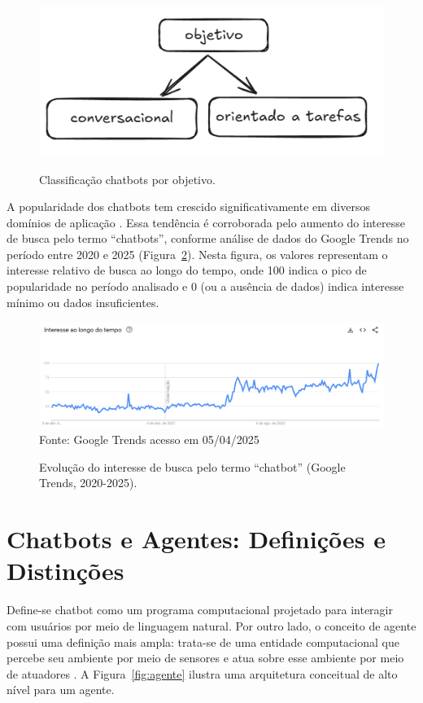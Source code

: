 \documentclass[14pt,a4paper,oneside]{book}
\begin{document}
\begin{figure}[!htbp]
	\centering
	\caption{Classificação chatbots por objetivo.}
	\includegraphics[width=0.9\linewidth]{./fig/tipo_objetivo.png}
	\label{fig:tipo}
\end{figure}

A popularidade dos chatbots tem crescido significativamente em diversos domínios de aplicação \cite{B2020, Klopfenstein2017, Sharma2020}. 
Essa tendência é corroborada pelo aumento do interesse de busca pelo termo ``chatbots'', conforme análise de dados do Google Trends no período entre 2020 e 2025 (Figura~\ref{fig:trends}). 
Nesta figura, os valores representam o interesse relativo de busca ao longo do tempo, onde 100 indica o pico de popularidade no período analisado e 0 (ou a ausência de dados) indica interesse mínimo ou dados insuficientes.

\begin{figure}[!htbp]
	\centering
	\caption{Evolução do interesse de busca pelo termo ``chatbot'' (Google Trends, 2020-2025).}
	\includegraphics[width=1\linewidth]{./fig/trends.png}
	\label{fig:trends}
	{\footnotesize Fonte: Google Trends acesso em 05/04/2025} %
\end{figure}

\section{Chatbots e Agentes: Definições e Distinções}

Define-se chatbot como um programa computacional projetado para interagir com usuários por meio de linguagem natural. 
Por outro lado, o conceito de agente possui uma definição mais ampla: trata-se de uma entidade computacional que percebe seu ambiente por meio de sensores e atua sobre esse ambiente por meio de atuadores \cite{Russel2013}. 
A Figura~\ref{fig:agente} ilustra uma arquitetura conceitual de alto nível para um agente.
\end{document}
